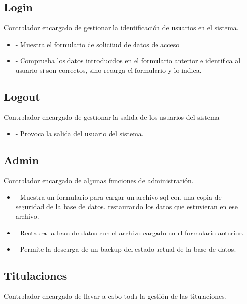 \subsection{Login}

Controlador encargado de gestionar la identificación de usuarios en el sistema.

\begin{itemize}
\item {} - Muestra el formulario de solicitud de datos de acceso.
\item {} - Comprueba los datos introducidos en el formulario anterior e identifica al usuario si son correctos, sino recarga el formulario y lo indica.
\end{itemize}

\subsection{Logout}

Controlador encargado de gestionar la salida de los usuarios del sistema

\begin{itemize}
\item {} - Provoca la salida del usuario del sistema.
\end{itemize}

\subsection{Admin}

Controlador encargado de algunas funciones de administración.

\begin{itemize}
\item {} - Muestra un formulario para cargar un archivo sql con una copia de seguridad de la base de datos, restaurando los datos que estuvieran en ese archivo.
\item {} - Restaura la base de datos con el archivo cargado en el formulario anterior.
\item {} - Permite la descarga de un backup del estado actual de la base de datos.
\end{itemize}

\subsection{Titulaciones}
Controlador encargado de llevar a cabo toda la gestión de las titulaciones.

